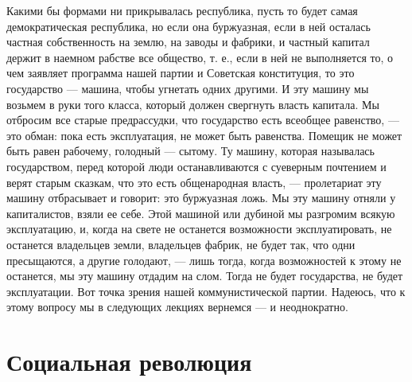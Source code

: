 \documentclass[12pt]{article}
\newcommand\resetparcount{%
  \setcounter{parcount}{0}
}
\newcommand{\parnum}{(\arabic{parcount})}
\newcounter{parcount}
\newenvironment{parnumbers}{%
  \par%
  \everypar{\noindent \stepcounter{parcount}\marginpar[]{\parnum}}%
}{}
\begin{document}
\begin{parnumbers}
Какими бы формами ни прикрывалась республика, пусть то будет самая демократическая республика, но если она буржуазная, если в ней осталась частная собственность на землю, на заводы и фабрики, и частный капитал держит в наемном рабстве все общество, т. е., если в ней не выполняется то, о чем заявляет программа нашей партии и Советская конституция, то это государство — машина, чтобы угнетать одних другими. И эту машину мы возьмем в руки того класса, который должен свергнуть власть капитала. Мы отбросим все старые предрассудки, что государство есть всеобщее равенство, — это обман: пока есть эксплуатация, не может быть равенства. Помещик не может быть равен рабочему, голодный — сытому. Ту машину, которая называлась государством, перед которой люди останавливаются с суеверным почтением и верят старым сказкам, что это есть общенародная власть, — пролетариат эту машину отбрасывает и говорит: это буржуазная ложь. Мы эту машину отняли у капиталистов, взяли ее себе. Этой машиной или дубиной мы разгромим всякую эксплуатацию, и, когда на свете не останется возможности эксплуатировать, не останется владельцев земли, владельцев фабрик, не будет так, что одни пресыщаются, а другие голодают, — лишь тогда, когда возможностей к этому не останется, мы эту машину отдадим на слом. Тогда не будет государства, не будет эксплуатации. Вот точка зрения нашей коммунистической партии. Надеюсь, что к этому вопросу мы в следующих лекциях вернемся — и неоднократно.
\end{parnumbers}

\section{Социальная революция}
\resetparcount
\end{document}
